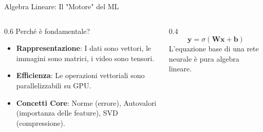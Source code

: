 \documentclass[aspectratio=169, 10pt]{beamer}
\begin{document}
\begin{frame}{Algebra Lineare: Il "Motore" del ML}
    \begin{columns}
        \begin{column}{0.6\textwidth}
            Perché è fondamentale?
            \begin{itemize}
                \item \textbf{Rappresentazione}: I dati sono vettori, le immagini sono matrici, i video sono tensori.
                \item \textbf{Efficienza}: Le operazioni vettoriali sono parallelizzabili su GPU.
                \item \textbf{Concetti Core}: Norme (errore), Autovalori (importanza delle feature), SVD (compressione).
            \end{itemize}
        \end{column}
        \begin{column}{0.4\textwidth}
            \centering
            \[ \mathbf{y} = \sigma(\mathbf{W}\mathbf{x} + \mathbf{b}) \]
            \small L'equazione base di una rete neurale è pura algebra lineare.
        \end{column}
    \end{columns}
\end{frame}
\end{document}

